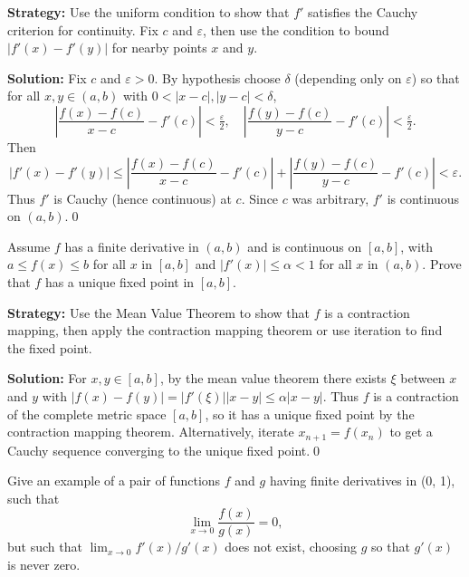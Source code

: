 \noindent\textbf{Strategy:} Use the uniform condition to show that \( f' \) satisfies the Cauchy criterion for continuity. Fix \( c \) and \( \varepsilon \), then use the condition to bound \( |f'(x) - f'(y)| \) for nearby points \( x \) and \( y \).

\bigskip\noindent\textbf{Solution:}
Fix $c$ and $\varepsilon>0$. By hypothesis choose $\delta$ (depending only on $\varepsilon$) so that for all $x,y\in(a,b)$ with $0<|x-c|,|y-c|<\delta$,
\[\left|\frac{f(x)-f(c)}{x-c}-f'(c)\right|<\tfrac\varepsilon2,\quad \left|\frac{f(y)-f(c)}{y-c}-f'(c)\right|<\tfrac\varepsilon2.\]
Then
\[|f'(x)-f'(y)|\le \left|\frac{f(x)-f(c)}{x-c}-f'(c)\right|+\left|\frac{f(y)-f(c)}{y-c}-f'(c)\right|<\varepsilon.\]
Thus $f'$ is Cauchy (hence continuous) at $c$. Since $c$ was arbitrary, $f'$ is continuous on $(a,b)$.\qed


\begin{problembox}
\begin{problemstatement}
Assume \( f \) has a finite derivative in \( (a, b) \) and is continuous on \( [a, b] \), with \( a \leq f(x) \leq b \) for all \( x \) in \( [a, b] \) and \( |f'(x)| \leq \alpha < 1 \) for all \( x \) in \( (a, b) \). Prove that \( f \) has a unique fixed point in \( [a, b] \).
\end{problemstatement}
\end{problembox}

\noindent\textbf{Strategy:} Use the Mean Value Theorem to show that \( f \) is a contraction mapping, then apply the contraction mapping theorem or use iteration to find the fixed point.

\bigskip\noindent\textbf{Solution:}
For $x,y\in[a,b]$, by the mean value theorem there exists $\xi$ between $x$ and $y$ with $|f(x)-f(y)|=|f'(\xi)||x-y|\le \alpha|x-y|$. Thus $f$ is a contraction of the complete metric space $[a,b]$, so it has a unique fixed point by the contraction mapping theorem. Alternatively, iterate $x_{n+1}=f(x_n)$ to get a Cauchy sequence converging to the unique fixed point.\qed


\begin{problembox}
\begin{problemstatement}
Give an example of a pair of functions \( f \) and \( g \) having finite derivatives in (0, 1), such that
\[ \lim_{x \to 0} \frac{f(x)}{g(x)} = 0, \]
but such that \( \lim_{x \to 0} f'(x)/g'(x) \) does not exist, choosing \( g \) so that \( g'(x) \) is never zero.
\end{problemstatement}
\end{problembox}

